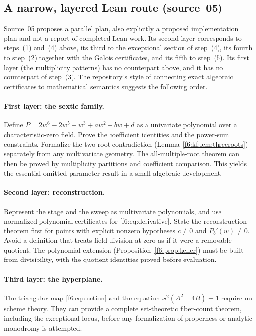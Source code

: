 \documentclass[11pt,a4paper]{article}
\theoremstyle{definition}
\newcommand{\src}[1]{\textup{(source~#1)}}
\begin{document}
\subsection{A narrow, layered Lean route \src{05}}
Source~05 proposes a parallel plan, also explicitly a proposed implementation
plan and not a report of completed Lean work. Its second layer corresponds to
steps~(1) and~(4) above, its third to the exceptional section of step~(4),
its fourth to step~(2) together with the Galois certificates, and its fifth
to step~(5). Its first layer (the multiplicity patterns) has no counterpart
above, and it has no counterpart of step~(3). The repository's style of connecting exact algebraic
certificates to mathematical semantics suggests the following order.

\paragraph{First layer: the sextic family.} Define
$P=2w^6-2w^5-w^3+aw^2+bw+d$ as a univariate polynomial over a
characteristic-zero field. Prove the coefficient identities and the
power-sum constraints. Formalize the two-root contradiction
(Lemma~\ref{f6:kf:lem:threeroots}) separately from any multivariate
geometry. The all-multiple-root theorem can then be proved by multiplicity
partitions and coefficient comparison. This yields the essential
omitted-parameter result in a small algebraic development.

\paragraph{Second layer: reconstruction.} Represent the stage and the sweep as
multivariate polynomials, and use normalized polynomial certificates for
\eqref{f6:eq:derivative}. State the reconstruction theorem first for points
with explicit nonzero hypotheses $c\ne0$ and $P_b'(w)\ne0$. Avoid a
definition that treats field division at zero as if it were a removable
quotient. The polynomial extension (Proposition~\ref{f6:prop:keller}) must be
built from divisibility, with the quotient identities proved before
evaluation.

\paragraph{Third layer: the hyperplane.} The triangular map
\eqref{f6:eq:section} and the equation $x^2(A^2+4B)=1$ require no scheme
theory. They can provide a complete set-theoretic fiber-count theorem,
including the exceptional locus, before any formalization of properness or
analytic monodromy is attempted.
\end{document}

